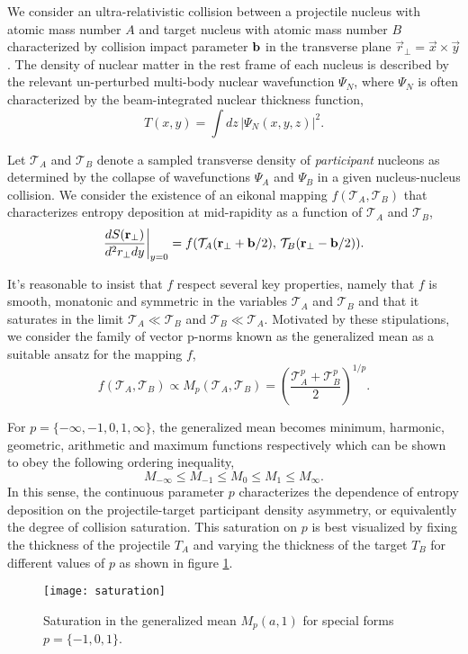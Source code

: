 \documentclass[aps,prl,reprint,amsmath,nofootinbib]{revtex4-1}
\begin{document}
We consider an ultra-relativistic collision between a projectile nucleus with atomic mass number $A$ and target nucleus with atomic mass number $B$ characterized 
by collision impact parameter ${\bf b}$ in the transverse plane $\vec{r}_\perp = \vec{x} \times \vec{y}$. The density of nuclear matter in the rest frame of each 
nucleus is described by the relevant un-perturbed multi-body nuclear wavefunction $\Psi_N$, where $\Psi_N$ is often characterized by the beam-integrated 
nuclear thickness function,
\begin{equation}
 T(x,y) = \int dz\, \left|\Psi_N(x,y,z) \right|^2. 
\end{equation}

Let $\mathcal{T}_A$ and $\mathcal{T}_B$ denote a sampled transverse density of \emph{participant} nucleons as determined by the collapse of wavefunctions $\Psi_A$ and
$\Psi_B$ in a given nucleus-nucleus collision. We consider the existence of an eikonal mapping $f(\mathcal{T}_A,\mathcal{T}_B)$ that characterizes entropy deposition at mid-rapidity as 
a function of $\mathcal{T}_A$ and $\mathcal{T}_B$,
\begin{equation}
  \label{ansatz}
  \frac{dS({\bf r}_\perp)}{d^2r_\perp dy} \biggr \rvert_{y=0}  = f(\mathcal{T}_A({\bf r}_\perp + {\bf b}/2),\,\mathcal{T}_B({\bf r}_\perp - {\bf b}/2)).
\end{equation}

It's reasonable to insist that $f$ respect several key properties, namely that $f$ is smooth, monatonic and symmetric in the variables $\mathcal{T}_A$ and 
$\mathcal{T}_B$ and that it saturates in the limit $\mathcal{T}_A \ll \mathcal{T}_B$ and $\mathcal{T}_B \ll \mathcal{T}_A$. Motivated by these stipulations, 
we consider the family of vector p-norms known as the generalized mean as a suitable ansatz for the mapping $f$,
\begin{equation}
 \label{generalized mean ansatz}
 f(\mathcal{T}_A, \mathcal{T}_B) \propto M_p(\mathcal{T}_A,\mathcal{T}_B) = \left( \frac{\mathcal{T}_A^p + \mathcal{T}_B^p}{2} \right)^{1/p}.
\end{equation}

For $p = \{-\infty,-1,0,1,\infty\}$, the generalized mean becomes minimum, harmonic, geometric, arithmetic and maximum functions respectively which can be shown
to obey the following ordering inequality, 
\begin{equation}
 M_{-\infty} \le M_{-1} \le M_{0} \le M_{1} \le M_{\infty}.
\end{equation}
In this sense, the continuous parameter $p$ characterizes the dependence of entropy deposition on the projectile-target participant density asymmetry, or equivalently 
the degree of collision saturation. This saturation on $p$ is best visualized by fixing the thickness of the projectile $T_A$ and varying the thickness of the target 
$T_B$ for different values of $p$ as shown in figure \ref{saturation}.
\begin{figure}[b]
 \texttt{[image: saturation]}
 \caption{\label{saturation}Saturation in the generalized mean $M_p(a, 1)$ for special forms $p=\{-1, 0, 1\}$.}
\end{figure}
\end{document}
